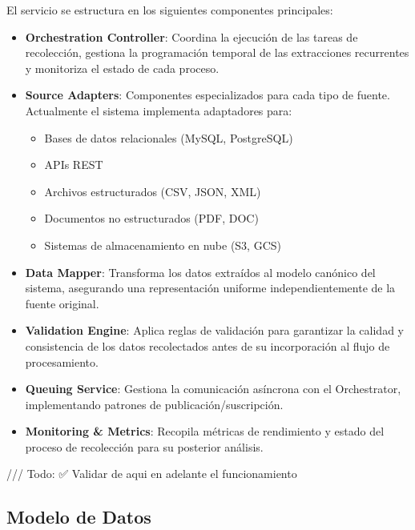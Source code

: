 \documentclass[12pt,a4paper]{article}
\begin{document}
El servicio se estructura en los siguientes componentes principales:

\begin{itemize}
    \item \textbf{Orchestration Controller}: Coordina la ejecución de las tareas de recolección, gestiona la programación temporal de las extracciones recurrentes y monitoriza el estado de cada proceso.
    
    \item \textbf{Source Adapters}: Componentes especializados para cada tipo de fuente. Actualmente el sistema implementa adaptadores para:
    \begin{itemize}
        \item Bases de datos relacionales (MySQL, PostgreSQL)
        \item APIs REST
        \item Archivos estructurados (CSV, JSON, XML)
        \item Documentos no estructurados (PDF, DOC)
        \item Sistemas de almacenamiento en nube (S3, GCS)
    \end{itemize}
    
    \item \textbf{Data Mapper}: Transforma los datos extraídos al modelo canónico del sistema, asegurando una representación uniforme independientemente de la fuente original.
    
    \item \textbf{Validation Engine}: Aplica reglas de validación para garantizar la calidad y consistencia de los datos recolectados antes de su incorporación al flujo de procesamiento.
    
    \item \textbf{Queuing Service}: Gestiona la comunicación asíncrona con el Orchestrator, implementando patrones de publicación/suscripción.
    
    \item \textbf{Monitoring & Metrics}: Recopila métricas de rendimiento y estado del proceso de recolección para su posterior análisis.
\end{itemize}



/// Todo: ✅ Validar de aqui en adelante el funcionamiento 




\subsection{Modelo de Datos}
\label{subsec:dh-modelo-datos}
\end{document}
